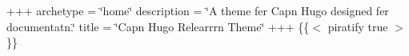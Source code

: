 +++ archetype = \char`\"{}home\char`\"{} description = \char`\"{}\+A theme fer Cap\textquotesingle{}n Hugo designed fer documentat\textquotesingle{}n.\char`\"{} title = \char`\"{}\+Cap\textquotesingle{}n Hugo Relearrrn Theme\char`\"{} +++ \{\{$<$ piratify true $>$\}\} 